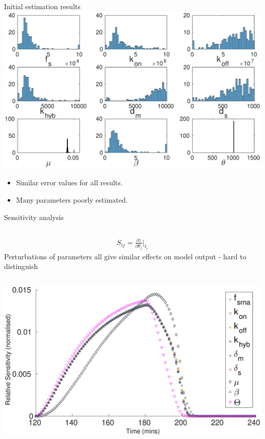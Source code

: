 \documentclass{beamer}
\begin{document}
\begin{frame}{Initial estimation results}
  \includegraphics[scale = 0.27, clip = true, trim = 130 0 0 50]{Figures/13_9_hist}
  \vspace{-10mm}
        \begin{itemize}
    \item Similar error values for all results.
    \item Many parameters poorly estimated.
            \end{itemize}
\end{frame}

\begin{frame}{Sensitivity analysis}
\begin{columns}
 \LARGE
\begin{align*}
S_{ij} =  \frac{\partial z}{ \partial \theta_{j}}\Bigr|_{t_{i}}
\end{align*}
\normalsize
{}
Perturbations of parameters all give similar effects on model output - \alert{hard to distinguish}
\end{columns}
  \includegraphics[scale = 0.25, clip = true, trim = 00 0 0 0]{Figures/Sensitivty_scaled_other}
\end{frame}
\end{document}
